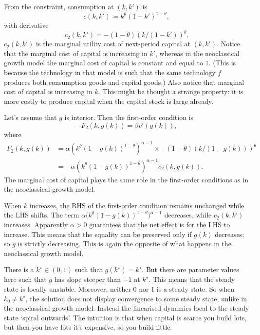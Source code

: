 \documentclass[11pt,letterpaper,reqno,oneside]{article}
\begin{document}
From the constraint, consumption at $(k,k')$ is
%
\begin{equation*}
	c(k,k') \coloneqq k^\theta (1-k')^{1-\theta} ,
\end{equation*}
%
with derivative
%
\begin{equation*}
	c_2(k,k') = - (1-\theta) (k/(1-k'))^\theta .
\end{equation*}
%
$c_2(k,k')$ is the marginal utility cost of next-period capital at $(k,k')$. Notice that the marginal cost of capital is increasing in $k'$, whereas in the neoclassical growth model the marginal cost of capital is constant and equal to $1$. (This is because the technology in that model is such that the same technology $f$ produces both consumption goods and capital goods.) Also notice that marginal cost of capital is increasing in $k$. This might be thought a strange property: it is more costly to produce capital when the capital stock is large already.

Let's assume that $g$ is interior. Then the first-order condition is
%
\begin{equation*}
	- F_2(k,g(k)) = \beta v'(g(k)) ,
\end{equation*}
%
where 
%
\begin{align*}
	F_2(k,g(k)) 
	&= \alpha \left( k^\theta (1-g(k))^{1-\theta} \right)^{\alpha-1}
	\times - (1-\theta) (k/(1-g(k)))^\theta
	\\
	&= - \alpha \left( k^\theta (1-g(k))^{1-\theta} \right)^{\alpha-1}
	c_2(k,g(k)) .
\end{align*}
%
The marginal cost of capital plays the same role in the first-order conditions as in the neoclassical growth model.

When $k$ increases, the RHS of the first-order condition remains unchanged while the LHS shifts. The term $\alpha \bigl( k^\theta (1-g(k))^{1-\theta} \bigr)^{\alpha-1}$ decreases, while $c_2(k,k')$ increases. Apparently $\alpha>0$ guarantees that the net effect is for the LHS to increase. This means that the equality can be preserved only if $g(k)$ decreases; so $g$ is strictly decreasing. This is again the opposite of what happens in the neoclassical growth model.

There is a $k^\star \in (0,1)$ such that $g(k^\star) = k^\star$. But there are parameter values here such that $g$ has slope steeper than $-1$ at $k^\star$. This means that the steady state is locally unstable. Moreover, neither $0$ nor $1$ is a steady state. So when $k_0 \neq k^\star$, the solution does not display convergence to some steady state, unlike in the neoclassical growth model. Instead the linearised dynamics local to the steady state `spiral outwards'. The intuition is that when capital is scarce you build lots, but then you have lots it's expensive, so you build little.
\end{document}
